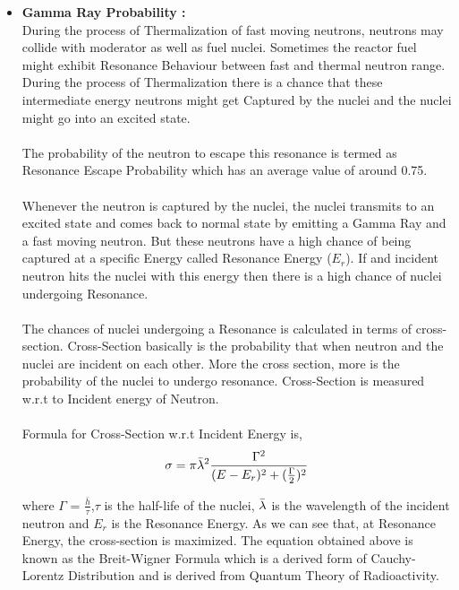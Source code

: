 \documentclass{article}
\begin{document}
\begin{itemize}
\begin{itemize}
        \item\textbf{ Gamma Ray Probability :}\\
            During the process of Thermalization of fast moving neutrons, neutrons may collide with moderator as well as fuel nuclei. Sometimes the reactor fuel might exhibit Resonance Behaviour between fast and thermal neutron range. During the process of Thermalization there is a chance that these intermediate energy neutrons might get Captured by the nuclei and the nuclei might go into an excited state.\\
            \\
            The probability of the neutron to escape this resonance is termed as Resonance Escape Probability which has an average value of around 0.75.\cite{cite12}\\
            \\
            Whenever the neutron is captured by the nuclei, the nuclei transmits to an excited state and comes back to normal state by emitting a Gamma Ray and a fast moving neutron. But these neutrons have a high chance of being captured at a specific Energy called Resonance Energy ($E_r$). If and incident neutron hits the nuclei with this energy then there is a high chance of nuclei undergoing Resonance.\\
            \\
            The chances of nuclei undergoing a Resonance is calculated in terms of cross-section. Cross-Section basically is the probability that when neutron and the nuclei are incident on each other. More the cross section, more is the probability of the nuclei to undergo resonance. Cross-Section is measured w.r.t to Incident energy of Neutron.\\
            \\
            Formula for Cross-Section w.r.t Incident Energy is,
            $$\sigma = \pi \Bar{\lambda}^2 \frac{\Gamma^2}{(E - E_r)^2 + (\frac{\Gamma}{2})^2}$$
            
            where $\Gamma$ = $\frac{\bar{h}}{\tau}$,$\tau$ is the half-life of the nuclei, $\Bar{\lambda}$ is the wavelength of the incident neutron and $E_r$ is the Resonance Energy. As we can see that, at Resonance Energy, the cross-section is maximized. The equation obtained above is known as the Breit-Wigner Formula which is a derived form of Cauchy-Lorentz Distribution and is derived from Quantum Theory of Radioactivity.
    \end{itemize}
\end{itemize}
\end{document}
